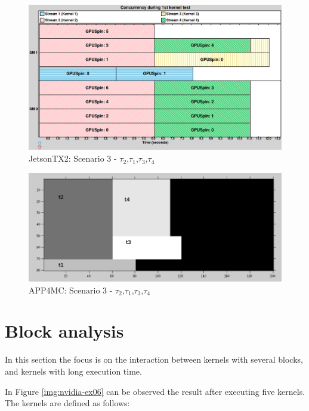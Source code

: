 \documentclass[
  12pt,
  a4paperpaper,
]{report}
\begin{document}
\begin{figure}
\centering
\includegraphics[width=1\textwidth,height=\textheight]{source/figures/nvidia/ex05.png}
\caption{JetsonTX2: Scenario 3 - \(\tau_2\),\(\tau_1\),\(\tau_3\),\(\tau_4\) \label{img:nvidia-ex05}}
\end{figure}

\begin{figure}
\centering
\includegraphics[width=1\textwidth,height=\textheight]{source/figures/octave/ex05.png}
\caption{APP4MC: Scenario 3 - \(\tau_2\),\(\tau_1\),\(\tau_3\),\(\tau_4\) \label{img:octave-ex05}}
\end{figure}

\hypertarget{block-analysis}{%
\section{Block analysis}\label{more-results}}

In this section the focus is on the interaction between kernels with several blocks, and kernels with long execution time.

In Figure \ref{img:nvidia-ex06} can be observed the result after
executing five kernels. The kernels are defined as follows:
\end{document}

